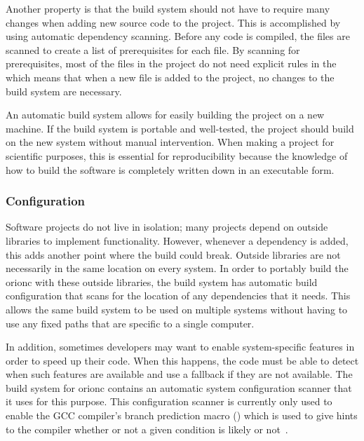 Another property is that the build system should not have to require many
changes when adding new source code to the project.  This is accomplished by
using automatic dependency scanning. Before any code is compiled, the files are
scanned to create a list of prerequisites for each file. By scanning for
prerequisites, most of the files in the project do not need explicit rules in
the  which means that when a new file is added to the
project, no changes to the build system are necessary.

An automatic build system allows for easily building the project on a new
machine. If the build system is portable and well-tested, the project should
build on the new system without manual intervention. When making a project for
scientific purposes, this is essential for reproducibility because the knowledge of
how to build the software is completely written down in an executable form.

\subsubsection{Configuration}

Software projects do not live in isolation; many projects depend on outside
libraries to implement functionality. However, whenever a dependency is added,
this adds another point where the build could break. Outside libraries are not
necessarily in the same location on every system. In order to portably build the
\gls{orionc} with these outside libraries, the build system has automatic build
configuration that scans for the location of any dependencies that it needs.
This allows the same build system to be used on multiple systems without having
to use any fixed paths that are specific to a single computer.

In addition, sometimes developers may want to enable system-specific features
in order to speed up their code. When this happens, the code must be able to
detect when such features are available and use a fallback if they are not
available. The build system for \gls{orionc} contains an automatic system
configuration scanner that it uses for this purpose. This configuration scanner
is currently only used to enable the GCC compiler's branch prediction macro
() which is used to give hints to the compiler
whether or not a given condition is likely or not~\autocite{drepper2007memory}.

